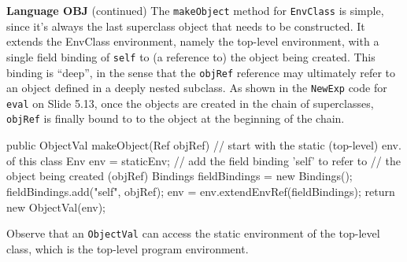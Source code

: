\begin{minipage}[t]{\sw}
\slidenumber
\LARGE
{\bf Language OBJ} (continued)\exx
The \verb'makeObject' method for \verb'EnvClass' is simple, since
it's always the last superclass object that needs to be constructed.
It extends the EnvClass environment, namely the top-level environment,
with a single field binding of \verb'self' to (a reference to) the object
being created. This binding is ``deep'', in the sense that the \verb'objRef'
reference may ultimately refer to an object defined in a deeply nested
subclass.
As shown in the \verb'NewExp' code for \verb'eval' on Slide 5.13,
once the objects are created in the chain of superclasses,
\verb'objRef' is finally bound to to the object
at the beginning of the chain.

\Large
\begin{qv}
public ObjectVal makeObject(Ref objRef) {
    // start with the static (top-level) env. of this class
    Env env = staticEnv;
    // add the field binding 'self' to refer to
    // the object being created (objRef)
    Bindings fieldBindings = new Bindings();
    fieldBindings.add("self", objRef);
    env = env.extendEnvRef(fieldBindings);
    return new ObjectVal(env);
}
\end{qv}
\LARGE
Observe that an \verb'ObjectVal' can access the static environment
of the top-level class, which is the top-level program environment.
\end{minipage}
